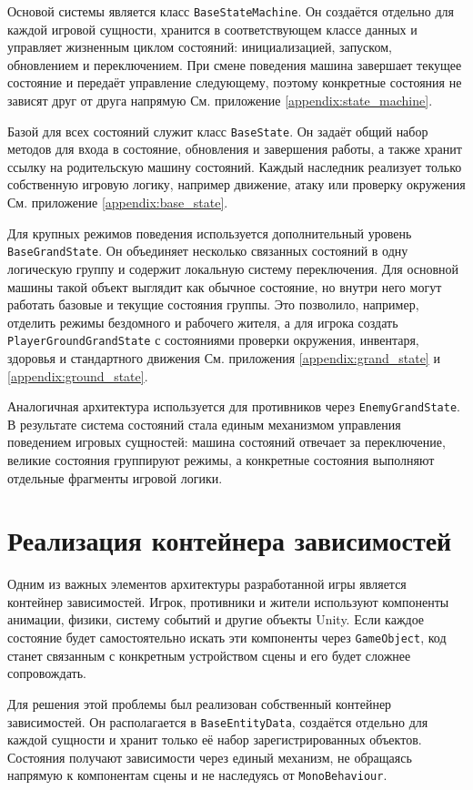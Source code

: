 \documentclass[a4paper,12pt]{report}
\begin{document}
Основой системы является класс \texttt{BaseStateMachine}. Он создаётся отдельно для каждой игровой сущности, хранится в соответствующем классе данных и управляет жизненным циклом состояний: инициализацией, запуском, обновлением и переключением. При смене поведения машина завершает текущее состояние и передаёт управление следующему, поэтому конкретные состояния не зависят друг от друга напрямую См. приложение \ref{appendix:state_machine}.

Базой для всех состояний служит класс \texttt{BaseState}. Он задаёт общий набор методов для входа в состояние, обновления и завершения работы, а также хранит ссылку на родительскую машину состояний. Каждый наследник реализует только собственную игровую логику, например движение, атаку или проверку окружения См. приложение \ref{appendix:base_state}.

Для крупных режимов поведения используется дополнительный уровень \texttt{BaseGrandState}. Он объединяет несколько связанных состояний в одну логическую группу и содержит локальную систему переключения. Для основной машины такой объект выглядит как обычное состояние, но внутри него могут работать базовые и текущие состояния группы. Это позволило, например, отделить режимы бездомного и рабочего жителя, а для игрока создать \texttt{PlayerGroundGrandState} с состояниями проверки окружения, инвентаря, здоровья и стандартного движения См. приложения \ref{appendix:grand_state} и \ref{appendix:ground_state}.

Аналогичная архитектура используется для противников через \texttt{EnemyGrandState}. В результате система состояний стала единым механизмом управления поведением игровых сущностей: машина состояний отвечает за переключение, великие состояния группируют режимы, а конкретные состояния выполняют отдельные фрагменты игровой логики.

\section{Реализация контейнера зависимостей}

Одним из важных элементов архитектуры разработанной игры является контейнер зависимостей. Игрок, противники и жители используют компоненты анимации, физики, систему событий и другие объекты Unity. Если каждое состояние будет самостоятельно искать эти компоненты через \texttt{GameObject}, код станет связанным с конкретным устройством сцены и его будет сложнее сопровождать.

Для решения этой проблемы был реализован собственный контейнер зависимостей. Он располагается в \texttt{BaseEntityData}, создаётся отдельно для каждой сущности и хранит только её набор зарегистрированных объектов. Состояния получают зависимости через единый механизм, не обращаясь напрямую к компонентам сцены и не наследуясь от \texttt{MonoBehaviour}.
\end{document}
